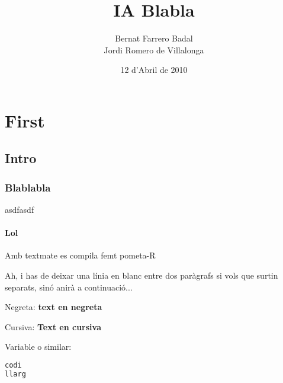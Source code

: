 \documentclass[a4paper]{report}
\author{Bernat Farrero Badal \\Jordi Romero de Villalonga}
\title{IA Blabla}
\date{12 d'Abril de 2010}
\begin{document}
\maketitle

\tableofcontents

\newpage

\chapter{First}

\section{Intro}

\subsection{Blablabla}
asdfasdf

\subsubsection{Lol}

Amb textmate es compila femt pometa-R

Ah, i has de deixar una línia en blanc entre dos paràgrafs si vols que surtin separats, sinó anirà a continuació...

Negreta: \textbf{text en negreta}

Cursiva: \textbf{Text en cursiva}

Variable o similar: 

\begin{lstlisting}[label=compi, caption=Comanda de compilació, language=Java]
codi
llarg
\end{lstlisting}
\end{document}
